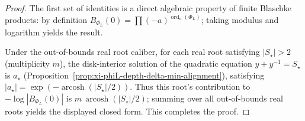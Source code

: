 \begin{proof}
The first set of identities is a direct algebraic property of finite Blaschke products: by definition \(B_{\Phi_L}(0)=\prod (-a)^{\operatorname{ord}_a(\Phi_L)}\); taking modulus and logarithm yields the result.
\par
Under the out-of-bounds real root caliber, for each real root satisfying \(|S_\star|>2\) (multiplicity \(m\)), the disk-interior solution of the quadratic equation \(y+y^{-1}=S_\star\) is \(a_\star\) (Proposition~\ref{prop:xi-phiL-depth-delta-min-alignment}), satisfying
\(
|a_\star|=\exp(-\operatorname{arcosh}(|S_\star|/2))
\).
Thus this root's contribution to \(-\log|B_{\Phi_L}(0)|\) is \(m\,\operatorname{arcosh}(|S_\star|/2)\); summing over all out-of-bounds real roots yields the displayed closed form. This completes the proof.
\end{proof}

\endinput
